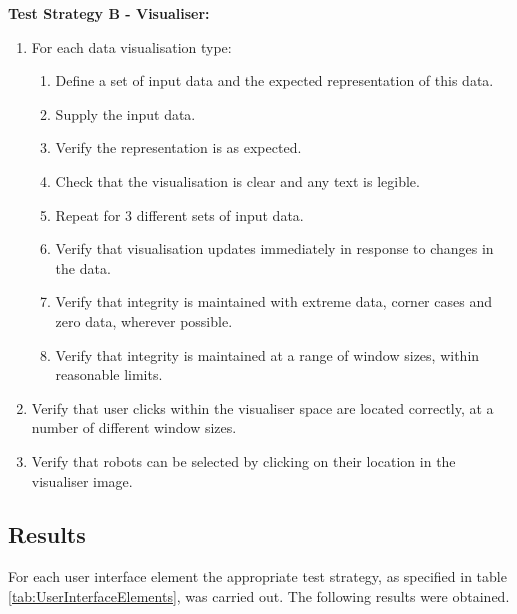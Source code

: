 \textbf{Test Strategy B - Visualiser:}

\begin{enumerate}
 \item For each data visualisation type:
 \begin{enumerate}
  \item Define a set of input data and the expected representation of this data.
  \item Supply the input data.
  \item Verify the representation is as expected.
  \item Check that the visualisation is clear and any text is legible.
  \item Repeat for 3 different sets of input data.
  \item Verify that visualisation updates immediately in response to changes in the data.
  \item Verify that integrity is maintained with extreme data, corner cases and zero data, wherever possible.
  \item Verify that integrity is maintained at a range of window sizes, within reasonable limits.
 \end{enumerate}
 \item Verify that user clicks within the visualiser space are located correctly, at a number of different window sizes.
 \item Verify that robots can be selected by clicking on their location in the visualiser image.
\end{enumerate}


\subsection{Results}
For each user interface element the appropriate test strategy, as specified in table \ref{tab:UserInterfaceElements}, was carried out. The following results were obtained.

